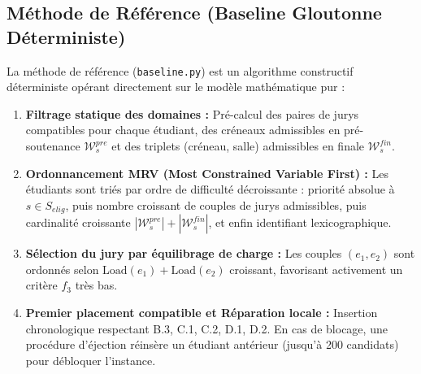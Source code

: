 \documentclass[10pt,a4paper]{article}
\begin{document}
\subsection{Méthode de Référence (Baseline Gloutonne Déterministe)}
La méthode de référence (\texttt{baseline.py}) est un algorithme constructif déterministe opérant directement sur le modèle mathématique pur :
\begin{enumerate}
    \item \textbf{Filtrage statique des domaines :} Pré-calcul des paires de jurys compatibles pour chaque étudiant, des créneaux admissibles en pré-soutenance $\mathcal{W}^{pre}_s$ et des triplets (créneau, salle) admissibles en finale $\mathcal{W}^{fin}_s$.
    \item \textbf{Ordonnancement MRV (Most Constrained Variable First) :} Les étudiants sont triés par ordre de difficulté décroissante : priorité absolue à $s \in S_{elig}$, puis nombre croissant de couples de jurys admissibles, puis cardinalité croissante $|\mathcal{W}^{pre}_s| + |\mathcal{W}^{fin}_s|$, et enfin identifiant lexicographique.
    \item \textbf{Sélection du jury par équilibrage de charge :} Les couples $(e_1, e_2)$ sont ordonnés selon $\text{Load}(e_1) + \text{Load}(e_2)$ croissant, favorisant activement un critère $f_3$ très bas.
    \item \textbf{Premier placement compatible et Réparation locale :} Insertion chronologique respectant B.3, C.1, C.2, D.1, D.2. En cas de blocage, une procédure d'éjection réinsère un étudiant antérieur (jusqu'à 200 candidats) pour débloquer l'instance.
\end{enumerate}
\end{document}
